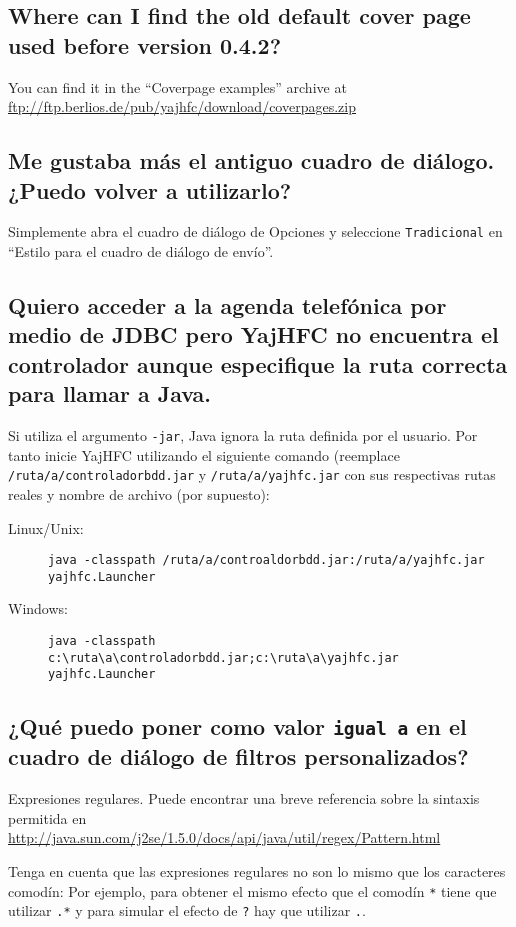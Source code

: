 \documentclass[a4paper,10pt]{scrartcl}
\begin{document}
\subsection{Where can I find the old default cover page used before version 0.4.2?}

You can find it in the ``Coverpage examples'' archive at \url{ftp://ftp.berlios.de/pub/yajhfc/download/coverpages.zip}


\subsection{Me gustaba más el antiguo cuadro de diálogo. ¿Puedo volver a utilizarlo?}

Simplemente abra el cuadro de diálogo de Opciones y seleccione \texttt{Tradicional} en ``Estilo para el cuadro de diálogo de envío''.

\subsection{Quiero acceder a la agenda telefónica por medio de JDBC pero YajHFC no encuentra el controlador aunque especifique la ruta correcta para llamar a Java.}

Si utiliza el argumento \texttt{-jar}, Java ignora la ruta definida por el usuario.
Por tanto inicie YajHFC utilizando el siguiente comando (reemplace \texttt{/ruta/a/controladorbdd.jar} y \texttt{/ruta/a/yajhfc.jar} con sus respectivas rutas reales y nombre de archivo (por supuesto):
\begin{description}
\item [Linux/Unix:] \verb#java -classpath /ruta/a/controaldorbdd.jar:/ruta/a/yajhfc.jar yajhfc.Launcher#
\item [Windows:] \verb#java -classpath c:\ruta\a\controladorbdd.jar;c:\ruta\a\yajhfc.jar yajhfc.Launcher#
\end{description}

\subsection{¿Qué puedo poner como valor \texttt{igual a} en el cuadro de diálogo de filtros personalizados? }

Expresiones regulares. Puede encontrar una breve referencia sobre la sintaxis permitida en
\url{http://java.sun.com/j2se/1.5.0/docs/api/java/util/regex/Pattern.html}

Tenga en cuenta que las expresiones regulares no son lo mismo que los caracteres comodín:
Por ejemplo, para obtener el mismo efecto que el comodín \verb.*. tiene que utilizar \verb#.*#
y para simular el efecto de \verb#?# hay que utilizar \verb#.#.
\end{document}

